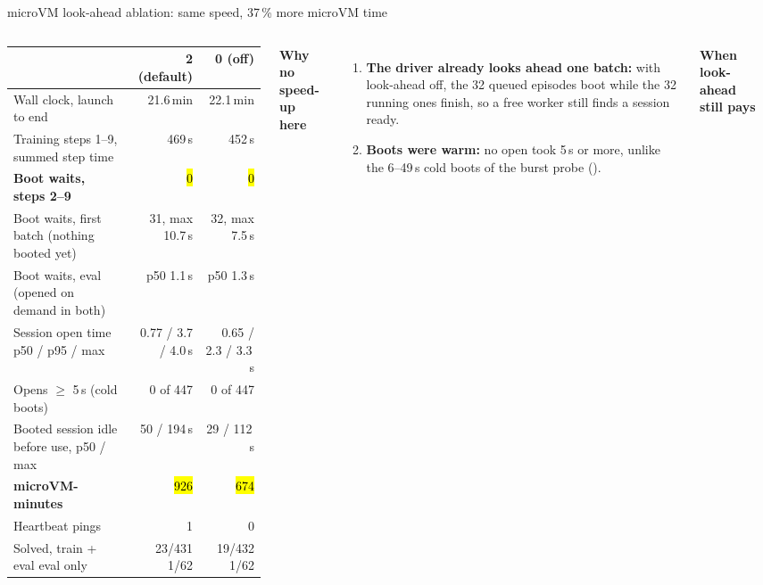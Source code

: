 \begin{frame}{microVM look-ahead ablation: same speed, 37\,\% more microVM time}
\begin{columns}[T]
\tiny\setlength{\tabcolsep}{3pt}
\begin{tabularx}{\linewidth}{@{}Yrr@{}}
\toprule
& \textbf{2 (default)} & \textbf{0 (off)}\\
\midrule
Wall clock, launch to end & 21.6\,min & 22.1\,min\\
Training steps 1--9, summed step time & 469\,s & 452\,s\\
\textbf{Boot waits, steps 2--9} & \hl{0} & \hl{0}\\
Boot waits, first batch (nothing booted yet) & 31, max 10.7\,s & 32, max 7.5\,s\\
Boot waits, eval (opened on demand in both) & p50 1.1\,s & p50 1.3\,s\\
Session open time p50 / p95 / max & 0.77 / 3.7 / 4.0\,s & 0.65 / 2.3 / 3.3\,s\\
Opens $\ge$ 5\,s (cold boots) & 0 of 447 & 0 of 447\\
Booted session idle before use, p50 / max & 50 / 194\,s & 29 / 112\,s\\
\textbf{microVM-minutes} & \hl{926} & \hl{674}\\
Heartbeat pings & 1 & 0\\
Solved, train + eval \textperiodcentered{} eval only & 23/431 \textperiodcentered{} 1/62 & 19/432 \textperiodcentered{} 1/62\\
\bottomrule
\end{tabularx}
\textbf{\footnotesize Why no speed-up here}
\begin{enumerate}\scriptsize\setlength{\itemsep}{0.6mm}
\item \textbf{The driver already looks ahead one batch:} with look-ahead off, the 32 queued episodes boot while the 32 running ones finish, so a free worker still finds a session ready.
\item \textbf{Boots were warm:} no open took 5\,s or more, unlike the 6--49\,s cold boots of the burst probe ().
\end{enumerate}
\vspace{1mm}
\textbf{\footnotesize When look-ahead still pays}
\begin{itemize}\scriptsize\setlength{\itemsep}{0.6mm}

\end{itemize}
\end{columns}
\end{frame}
